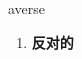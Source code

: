 
\begin{frame}
{\huge averse}
\begin{center}
\begin{enumerate}\Large
  \item \textbf{反对的}
\end{enumerate}
\end{center}
\end{frame}

